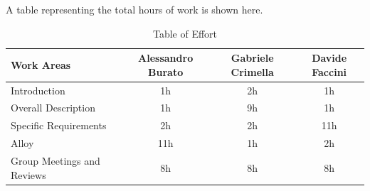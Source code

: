 A table representing the total hours of work is shown here.
\begin{table}[h]
\centering
\begin{tabular}{l c c c}
\toprule
Work Areas & Alessandro Burato & Gabriele Crimella & Davide Faccini \\
\midrule
Introduction & 1h & 2h & 1h\\
Overall Description & 1h & 9h & 1h\\
Specific Requirements & 2h & 2h & 11h\\
Alloy & 11h & 1h & 2h\\
Group Meetings and Reviews & 8h & 8h & 8h\\
\bottomrule
\end{tabular}
\caption{Table of Effort}
\end{table}